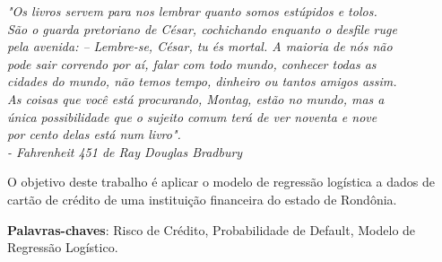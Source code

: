 \documentclass[
	12pt,				%
	openright,			%
	oneside,      %
	a4paper,			%
	english,			%
	french,				%
	spanish,			%
	brazil,				%
	]{abntex2}\usepackage[]{graphicx}\usepackage[]{xcolor}
\begin{document}

\frenchspacing


\imprimircapa

\imprimirfolhaderosto
\clearpage

\begin{epigrafe} 
  \vspace*{\fill} 
  \begin{flushright} 
  \textit{"Os livros servem para nos lembrar quanto somos estúpidos e tolos. 
      \\ São o guarda pretoriano de César, cochichando enquanto o desfile ruge 
      \\ pela avenida: – Lembre-se, César, tu és mortal. A maioria de nós não 
      \\ pode sair correndo por aí, falar com todo mundo, conhecer todas as 
      \\ cidades do mundo, não temos tempo, dinheiro ou tantos amigos assim. 
      \\ As coisas que você está procurando, Montag, estão no mundo, mas a 
      \\ única possibilidade que o sujeito comum terá de ver noventa e nove 
      \\ por cento delas está num livro". 
      \\ - Fahrenheit 451 de Ray Douglas Bradbury} 
  \end{flushright} 
\end{epigrafe}

\begin{resumo} 
  O objetivo deste trabalho é aplicar o modelo de regressão logística a dados
  de cartão de crédito de uma instituição financeira do estado de Rondônia.
  \vspace{\onelineskip} 
  \noindent
  
  \textbf{Palavras-chaves}: Risco de Crédito, Probabilidade de Default, Modelo de Regressão Logístico. 
\end{resumo}
\end{document}
